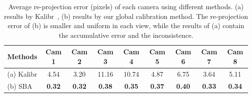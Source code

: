 \begin{table}
	\centering
	\caption{Average re-projection error (pixels) of each camera using different methods. (a) results by Kalibr~\cite{Maye2013Self}, (b) results by our global calibration method. The re-projection error of (b) is smaller and uniform in each view, while the results of (a) contain the accumulative error and the inconsistence. }
	\label{tab:reprojection}
	\begin{tabular}{lcccccccc}
		\hline
		Methods & Cam 1 & Cam 2 & Cam 3 & Cam 4 & Cam 5 & Cam 6 & Cam 7 & Cam 8\\
		\hline
		(a) Kalibr &4.54 &3.20 &11.16 &10.74 &4.87 &6.75 &3.64 &5.11\\
		
		(b) SBA   &\textbf{0.32} &\textbf{0.32} &\textbf{0.38}  &\textbf{0.35} &\textbf{0.37} &\textbf{0.40} &\textbf{0.33} &\textbf{0.34} \\
		
		\hline
		
	\end{tabular}


\end{table}


